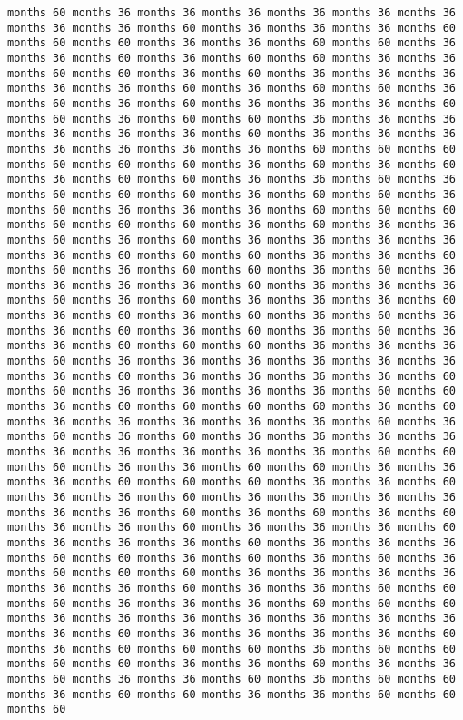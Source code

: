 \documentclass[11pt]{article}
\begin{document}
\begin{Verbatim}[commandchars=\\\{\}, frame=single, framerule=2mm, rulecolor=\color{outerrorbackground}]
months 60 months 36 months 36 months 36 months 36 months 36 months 36 months 36 months 36 months 60 months 36 months 36 months 36 months 60 months 60 months 60 months 36 months 36 months 60 months 60 months 36 months 36 months 60 months 36 months 60 months 60 months 36 months 36 months 60 months 60 months 36 months 60 months 36 months 36 months 36 months 36 months 36 months 60 months 36 months 60 months 60 months 36 months 60 months 36 months 60 months 36 months 36 months 36 months 60 months 60 months 36 months 60 months 60 months 36 months 36 months 36 months 36 months 36 months 36 months 60 months 36 months 36 months 36 months 36 months 36 months 36 months 36 months 60 months 60 months 60 months 60 months 60 months 60 months 36 months 60 months 36 months 60 months 36 months 60 months 60 months 36 months 36 months 60 months 36 months 60 months 60 months 60 months 36 months 60 months 60 months 36 months 60 months 36 months 36 months 36 months 60 months 60 months 60 months 60 months 60 months 60 months 36 months 60 months 36 months 36 months 60 months 36 months 60 months 36 months 36 months 36 months 36 months 36 months 60 months 60 months 60 months 36 months 36 months 60 months 60 months 36 months 60 months 60 months 36 months 60 months 36 months 36 months 36 months 36 months 60 months 36 months 36 months 36 months 60 months 36 months 60 months 36 months 36 months 36 months 60 months 36 months 60 months 36 months 60 months 36 months 60 months 36 months 36 months 60 months 36 months 60 months 36 months 60 months 36 months 36 months 60 months 60 months 60 months 36 months 36 months 36 months 60 months 36 months 36 months 36 months 36 months 36 months 36 months 36 months 60 months 36 months 36 months 36 months 36 months 60 months 60 months 36 months 36 months 36 months 36 months 60 months 60 months 36 months 60 months 60 months 60 months 60 months 36 months 60 months 36 months 36 months 36 months 36 months 36 months 60 months 36 months 60 months 36 months 60 months 36 months 36 months 36 months 36 months 36 months 36 months 36 months 36 months 36 months 60 months 60 months 60 months 36 months 36 months 60 months 60 months 36 months 36 months 36 months 60 months 60 months 60 months 36 months 36 months 60 months 36 months 36 months 60 months 36 months 36 months 36 months 36 months 36 months 36 months 60 months 36 months 60 months 36 months 60 months 36 months 36 months 60 months 36 months 36 months 36 months 60 months 36 months 36 months 36 months 60 months 36 months 36 months 36 months 60 months 60 months 36 months 60 months 36 months 60 months 36 months 60 months 60 months 60 months 36 months 36 months 36 months 36 months 36 months 36 months 60 months 36 months 36 months 60 months 60 months 60 months 36 months 36 months 36 months 60 months 60 months 60 months 36 months 36 months 36 months 36 months 36 months 36 months 36 months 36 months 60 months 36 months 36 months 36 months 36 months 60 months 36 months 60 months 60 months 60 months 36 months 60 months 60 months 60 months 60 months 36 months 36 months 60 months 36 months 36 months 60 months 36 months 36 months 60 months 36 months 60 months 60 months 36 months 60 months 60 months 36 months 36 months 60 months 60 months 60 
\end{Verbatim}
\end{document}
